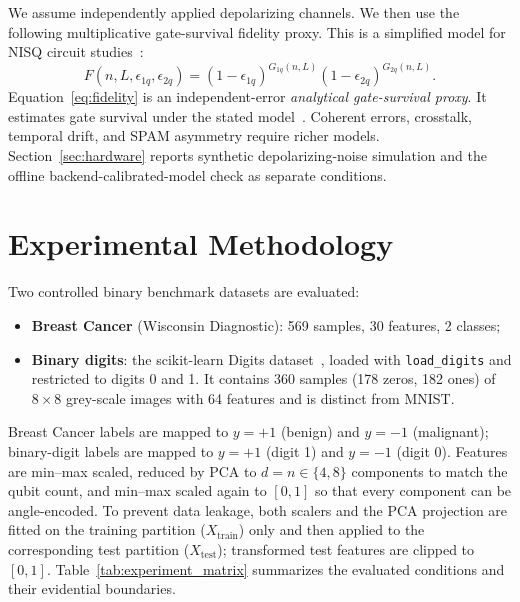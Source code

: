 \documentclass[final,5p,times,number]{elsarticle}
\begin{document}
We assume independently applied depolarizing channels. We then use the following multiplicative gate-survival fidelity proxy. This is a simplified model for NISQ circuit studies~\cite{preskill2018nisq,bharti2022noisy}:
\begin{equation}
  F(n,L,\epsilon_{1q},\epsilon_{2q}) = (1-\epsilon_{1q})^{G_{1q}(n,L)} (1-\epsilon_{2q})^{G_{2q}(n,L)}.
  \label{eq:fidelity}
\end{equation}
Equation~\eqref{eq:fidelity} is an independent-error \emph{analytical gate-survival proxy}. It estimates gate survival under the stated model~\cite{preskill2018nisq,bharti2022noisy}. Coherent errors, crosstalk, temporal drift, and SPAM asymmetry require richer models. Section~\ref{sec:hardware} reports synthetic depolarizing-noise simulation and the offline backend-calibrated-model check as separate conditions.

\section{Experimental Methodology}
\label{sec:methodology}

Two controlled binary benchmark datasets are evaluated:
\begin{itemize}[leftmargin=*]
  \item \textbf{Breast Cancer} (Wisconsin Diagnostic): 569 samples, 30 features, 2 classes;
  \item \textbf{Binary digits}: the scikit-learn Digits dataset~\cite{pedregosa2011scikit}, loaded with \texttt{load\_digits} and restricted to digits 0 and 1. It contains 360 samples (178 zeros, 182 ones) of $8\times8$ grey-scale images with 64 features and is distinct from MNIST.
\end{itemize}
Breast Cancer labels are mapped to $y=+1$ (benign) and $y=-1$ (malignant); binary-digit labels are mapped to $y=+1$ (digit 1) and $y=-1$ (digit 0). Features are min--max scaled, reduced by PCA to $d=n\in\{4,8\}$ components to match the qubit count, and min--max scaled again to $[0,1]$ so that every component can be angle-encoded. To prevent data leakage, both scalers and the PCA projection are fitted on the training partition ($X_{\text{train}}$) only and then applied to the corresponding test partition ($X_{\text{test}}$); transformed test features are clipped to $[0,1]$. Table~\ref{tab:experiment_matrix} summarizes the evaluated conditions and their evidential boundaries.
\end{document}
